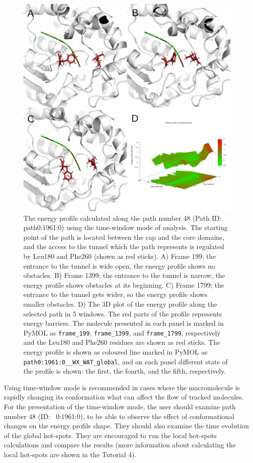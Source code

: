 \documentclass[9pt,tutorial]{livecoms}
\begin{document}
\begin{figure}[ht!]
\centering
\includegraphics{Tut4.6.png}
\caption{The energy profile calculated along the path number 48 (Path ID: path0:1961:0) using the time-window mode of analysis. The starting point of the path is located between the cap and the core domains, and the access to the tunnel which the path represents is regulated by Leu180 and Phe260 (shown as red sticks). A) Frame 199; the entrance to the tunnel is wide open, the energy profile shows no obstacles. B) Frame 1399; the entrance to the tunnel is narrow, the energy profile shows obstacles at its beginning. C) Frame 1799; the entrance to the tunnel gets wider, so the energy profile shows smaller obstacles. D) The 3D plot of the energy profile along the selected path in 5 windows. The red parts of the profile represents energy barriers. The molecule presented in each panel is marked in PyMOL as \texttt{frame\_199}, \texttt{frame\_1399}, and \texttt{frame\_1799}, respectively and the Leu180 and Phe260 residues are shown as red sticks. The energy profile is shown as coloured line marked in PyMOL as \texttt{path0:1961:0\_\_WX\_WAT\_global}, and on each panel different state of the profile is shown: the first, the fourth, and the fifth, respectively.}
\label{Tut4.6}
\end{figure}

Using time-window mode is recommended in cases where the macromolecule is rapidly changing its conformation what can affect the flow of tracked molecules. For the presentation of the time-window mode, the user should examine path number 48 (ID:~ 0:1961:0), to be able to observe the effect of conformational changes on the energy profile shape. They should also examine the time evolution of the global hot-spots. They are encouraged to run the local hot-spots calculations and compare the results (more information about calculating the local hot-spots are shown in the Tutorial 4).
\end{document}
